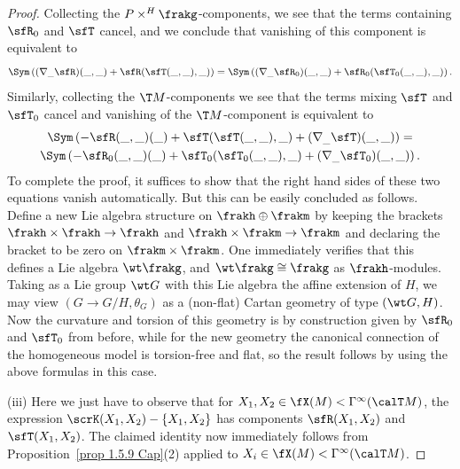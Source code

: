 \begin{proof}
    Collecting the $P\times^H\frakg$-components, we see that the terms containing $\sfR_0$ and $\sfT$ cancel, and we conclude that vanishing of this component is equivalent to 
    \[\Sym\left((\nabla_{\_}\sfR)(\_,\_)+\sfR(\sfT(\_,\_),\_)\right)=\Sym\left((\nabla_{\_}\sfR_0)(\_,\_)+\sfR_0(\sfT_0(\_,\_),\_)\right).\]
    Similarly, collecting the $\T M$-components we see that the terms mixing $\sfT$ and $\sfT_0$ cancel and vanishing of the $\T M$-component is equivalent to 
    \begin{multline}
        \Sym\left(-\sfR(\_,\_)(\_)+\sfT(\sfT(\_,\_),\_)+(\nabla_{\_}\sfT)(\_,\_)\right)=\\
        \Sym\left(-\sfR_0(\_,\_)(\_)+\sfT_0(\sfT_0(\_,\_),\_)+(\nabla_{\_}\sfT_0)(\_,\_)\right).
    \end{multline}
    To complete the proof, it suffices to show that the right hand sides of these two equations vanish automatically. But this can be easily concluded as follows. Define a new Lie algebra structure on $\frakh\oplus\frakm$ by keeping the brackets $\frakh\times\frakh\to\frakh$ and $\frakh\times\frakm\to\frakm$ and declaring the bracket to be zero on $\frakm\times\frakm$. One immediately verifies that this defines a Lie algebra $\wt\frakg$, and $\wt\frakg\cong \frakg$ as $\frakh$-modules. Taking as a Lie group $\wt G$ with this Lie algebra the affine extension of $H$, we may view $(G\to G\slash H,\theta_G)$ as a (non-flat) Cartan geometry of type $(\wt G,H)$. Now the curvature and torsion of this geometry is by construction given by $\sfR_0$ and $\sfT_0$ from before, while for the new geometry the canonical connection of the homogeneous model is torsion-free and flat, so the result follows by using the above formulas in this case.

    (iii) Here we just have to observe that for $X_1,X_2\in \fX(M)<\Gamma^\infty(\calT M)$, the expression $\scrK(X_1,X_2)-\{X_1,X_2\}$ has components $\sfR(X_1,X_2)$ and $\sfT(X_1,X_2)$. The claimed identity now immediately follows from Proposition~\ref{prop 1.5.9 Cap}(2) applied to $X_i\in\fX(M)<\Gamma^\infty(\calT M)$.
\end{proof}


